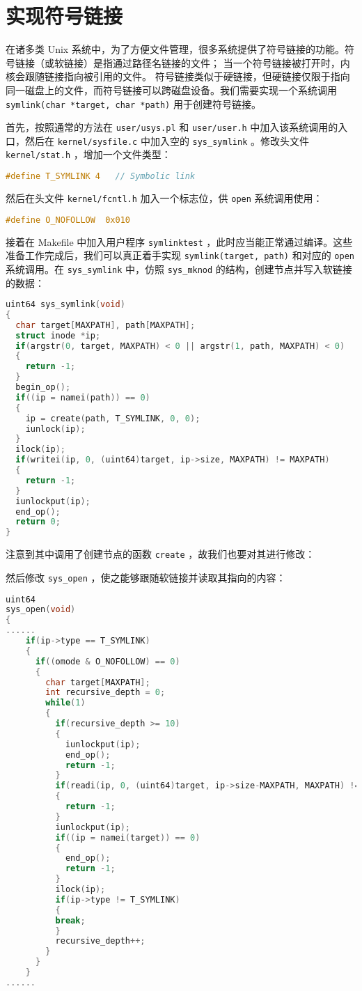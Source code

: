 \section{实现符号链接}

在诸多类 Unix 系统中，为了方便文件管理，很多系统提供了符号链接的功能。符号链接（或软链接）是指通过路径名链接的文件； 当一个符号链接被打开时，内核会跟随链接指向被引用的文件。 符号链接类似于硬链接，但硬链接仅限于指向同一磁盘上的文件，而符号链接可以跨磁盘设备。我们需要实现一个系统调用 \lstinline{symlink(char *target, char *path)} 用于创建符号链接。

首先，按照通常的方法在 \lstinline{user/usys.pl} 和 \lstinline{user/user.h} 中加入该系统调用的入口，然后在 \lstinline{kernel/sysfile.c} 中加入空的 \lstinline{sys_symlink} 。修改头文件 \lstinline{kernel/stat.h} ，增加一个文件类型：
\begin{lstlisting}[language=C]
    #define T_SYMLINK 4   // Symbolic link
\end{lstlisting}

然后在头文件 \lstinline{kernel/fcntl.h} 加入一个标志位，供 \lstinline{open} 系统调用使用：
\begin{lstlisting}[language=C]
    #define O_NOFOLLOW  0x010
\end{lstlisting}

接着在 Makefile 中加入用户程序 \lstinline{symlinktest} ，此时应当能正常通过编译。这些准备工作完成后，我们可以真正着手实现 \lstinline{symlink(target, path)} 和对应的 \lstinline{open} 系统调用。在 \lstinline{sys_symlink} 中，仿照 \lstinline{sys_mknod} 的结构，创建节点并写入软链接的数据：
\begin{lstlisting}[language=C]
uint64 sys_symlink(void)
{
  char target[MAXPATH], path[MAXPATH];
  struct inode *ip;
  if(argstr(0, target, MAXPATH) < 0 || argstr(1, path, MAXPATH) < 0)
  {
    return -1;
  }
  begin_op();
  if((ip = namei(path)) == 0)
  {
    ip = create(path, T_SYMLINK, 0, 0);
    iunlock(ip);
  }
  ilock(ip);
  if(writei(ip, 0, (uint64)target, ip->size, MAXPATH) != MAXPATH)
  {
    return -1;
  }
  iunlockput(ip);
  end_op();
  return 0;
}
\end{lstlisting}

注意到其中调用了创建节点的函数 \lstinline{create} ，故我们也要对其进行修改：

然后修改 \lstinline{sys_open} ，使之能够跟随软链接并读取其指向的内容：
\begin{lstlisting}[language=C]
uint64
sys_open(void)
{
......
    if(ip->type == T_SYMLINK) 
    {
      if((omode & O_NOFOLLOW) == 0)
      {
        char target[MAXPATH];
        int recursive_depth = 0;
        while(1)
        {
          if(recursive_depth >= 10)
          {
	        iunlockput(ip);
	        end_op();
	        return -1;
	      }
          if(readi(ip, 0, (uint64)target, ip->size-MAXPATH, MAXPATH) != MAXPATH)
          {
	        return -1;
	      }
          iunlockput(ip);
	      if((ip = namei(target)) == 0)
          {
	        end_op();
	        return -1;
	      }
	      ilock(ip);
	      if(ip->type != T_SYMLINK)
          {
	      break;
	      }
	      recursive_depth++;
        }
      }
    }
......
\end{lstlisting}

